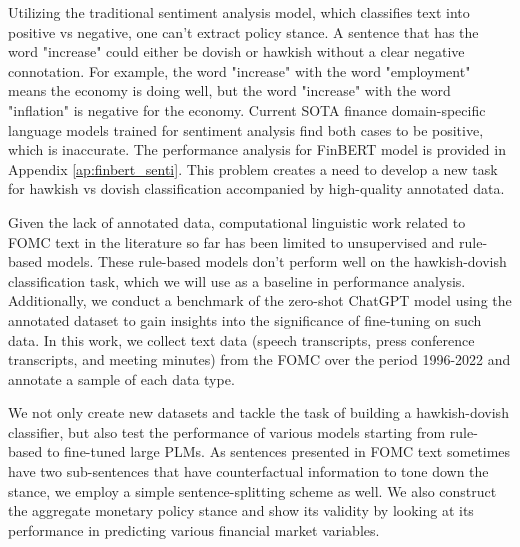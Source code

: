 \documentclass[11pt]{article}
\begin{document}
Utilizing the traditional sentiment analysis model, which classifies text into positive vs negative, one can't extract policy stance. A sentence that has the word "increase" could either be dovish or hawkish without a clear negative connotation. For example, the word "increase" with the word "employment" means the economy is doing well, but the word "increase" with the word "inflation" is negative for the economy. Current SOTA finance domain-specific language models \citep{orig_finbert, shah-etal-2022-flang} trained for sentiment analysis find both cases to be positive, which is inaccurate. The performance analysis for FinBERT \citep{orig_finbert} model is provided in Appendix \ref{ap:finbert_senti}. This problem creates a need to develop a new task for hawkish vs dovish classification accompanied by high-quality annotated data. 

Given the lack of annotated data, computational linguistic work related to FOMC text in the literature \citep{rozkrut2007quest, zirn-etal-2015-lost, hansen2016shocking, rohlfs-etal-2016-effects, hansen2018transparency, nakamura2018high, cieslak2019stock, schmeling2019does, tsukioka2020tone, ehrmann2020starting, frunza-2020-information, gorodnichenko2021voice, matsui-etal-2021-using, 10.1145/3503161.3548380} so far has been limited to unsupervised and rule-based models. These rule-based models don't perform well on the hawkish-dovish classification task, which we will use as a baseline in performance analysis. Additionally, we conduct a benchmark of the zero-shot ChatGPT model using the annotated dataset to gain insights into the significance of fine-tuning on such data. In this work, we collect text data (speech transcripts, press conference transcripts, and meeting minutes) from the FOMC over the period 1996-2022 and annotate a sample of each data type.

We not only create new datasets and tackle the task of building a hawkish-dovish classifier, but also test the performance of various models starting from rule-based to fine-tuned large PLMs. As sentences presented in FOMC text sometimes have two sub-sentences that have counterfactual information to tone down the stance, we employ a simple sentence-splitting scheme as well. We also construct the aggregate monetary policy stance and show its validity by looking at its performance in predicting various financial market variables. 
\end{document}
